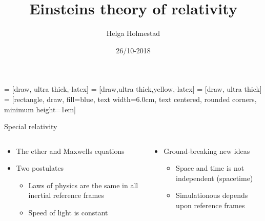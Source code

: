\documentclass{beamer}
\title[]{Einsteins theory of relativity}
\author{Helga Holmestad}
\institute{University of Oslo}
\date{26/10-2018}
\begin{document}
\begin{frame}
  \titlepage
\end{frame}


   = [draw, ultra thick,-latex]
       = [draw,ultra thick,yellow,-latex]
       = [draw, ultra thick]
       = [rectangle, draw, fill=blue, 
        text width=6.0cm, text centered, rounded corners, minimum height=1em]
      
\begin{frame}{\centering Special relativity}
  \begin{columns}
    \begin{column}{0.5\textwidth}
      \begin{itemize}
      \item<1->{The ether and Maxwells equations}
      \item<2->{Two postulates }
        \begin{itemize}
        \item<2->{Laws of physics are the same in all inertial reference frames}
        \item<2->{Speed of light is constant}
        \end{itemize}
      \end{itemize}
    \end{column}
    \begin{column}{0.5\textwidth}
      \begin{itemize}
        \item<3->{Ground-breaking new ideas}
        \begin{itemize}
        \item<3->{Space and time is not independent (spacetime)}
        \item<3->{Simulationous depends upon reference frames}
        \end{itemize}
        \end{itemize}
         \end{column}
  \end{columns}  
  \begin{center}
    \begin{tikzpicture}
        

\end{tikzpicture}
\end{center}
\end{frame}
\end{document}
